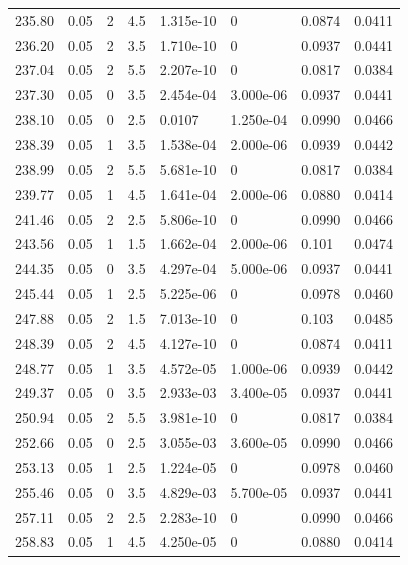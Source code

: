\documentclass[preview]{standalone}
\begin{document}
{{{{{\begin{tabular}{L{1.2cm}C{1.2cm} C{0.3cm}C{0.5cm} C{1.4cm}C{1.4cm} C{1.4cm}C{1.4cm}}
  235.80  &  0.05  & 2     & 4.5 &  1.315e-10  & 0  & 0.0874 &  0.0411   \\ 
  236.20  &  0.05  & 2     & 3.5 &  1.710e-10  & 0  & 0.0937 &  0.0441   \\ 
  237.04  &  0.05  & 2     & 5.5 &  2.207e-10  & 0  & 0.0817 &  0.0384   \\ 
  237.30  &  0.05  & 0     & 3.5 &  2.454e-04  & 3.000e-06  & 0.0937 &  0.0441   \\ 
  238.10  &  0.05  & 0     & 2.5 &  0.0107  & 1.250e-04  & 0.0990 &  0.0466   \\ 
  238.39  &  0.05  & 1     & 3.5 &  1.538e-04  & 2.000e-06  & 0.0939 &  0.0442   \\ 
  238.99  &  0.05  & 2     & 5.5 &  5.681e-10  & 0  & 0.0817 &  0.0384   \\ 
  239.77  &  0.05  & 1     & 4.5 &  1.641e-04  & 2.000e-06  & 0.0880 &  0.0414   \\ 
  241.46  &  0.05  & 2     & 2.5 &  5.806e-10  & 0  & 0.0990 &  0.0466   \\ 
  243.56  &  0.05  & 1     & 1.5 &  1.662e-04  & 2.000e-06  & 0.101 &  0.0474   \\ 
  244.35  &  0.05  & 0     & 3.5 &  4.297e-04  & 5.000e-06  & 0.0937 &  0.0441   \\ 
  245.44  &  0.05  & 1     & 2.5 &  5.225e-06  & 0  & 0.0978 &  0.0460   \\ 
  247.88  &  0.05  & 2     & 1.5 &  7.013e-10  & 0  & 0.103 &  0.0485   \\ 
  248.39  &  0.05  & 2     & 4.5 &  4.127e-10  & 0  & 0.0874 &  0.0411   \\ 
  248.77  &  0.05  & 1     & 3.5 &  4.572e-05  & 1.000e-06  & 0.0939 &  0.0442   \\ 
  249.37  &  0.05  & 0     & 3.5 &  2.933e-03  & 3.400e-05  & 0.0937 &  0.0441   \\ 
  250.94  &  0.05  & 2     & 5.5 &  3.981e-10  & 0  & 0.0817 &  0.0384   \\ 
  252.66  &  0.05  & 0     & 2.5 &  3.055e-03  & 3.600e-05  & 0.0990 &  0.0466   \\ 
  253.13  &  0.05  & 1     & 2.5 &  1.224e-05  & 0  & 0.0978 &  0.0460   \\ 
  255.46  &  0.05  & 0     & 3.5 &  4.829e-03  & 5.700e-05  & 0.0937 &  0.0441   \\ 
  257.11  &  0.05  & 2     & 2.5 &  2.283e-10  & 0  & 0.0990 &  0.0466   \\ 
  258.83  &  0.05  & 1     & 4.5 &  4.250e-05  & 0  & 0.0880 &  0.0414   \\ 

\end{tabular}}}}}}
\end{document}

